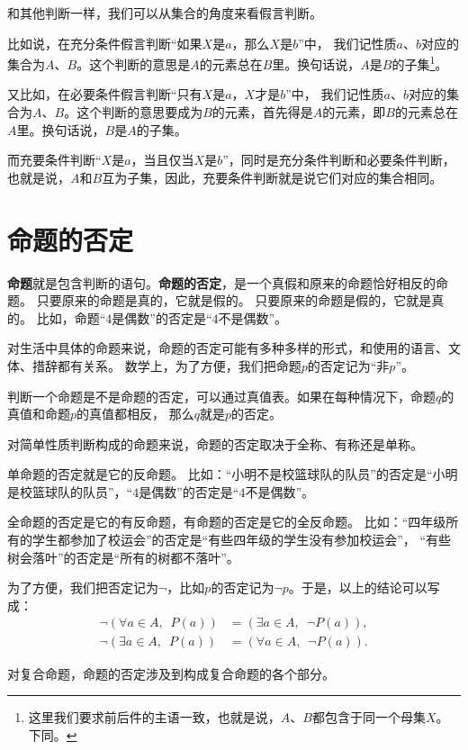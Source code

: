 和其他判断一样，我们可以从集合的角度来看假言判断。

比如说，在充分条件假言判断“如果$X$是$a$，那么$X$是$b$”中，
我们记性质$a$、$b$对应的集合为$A$、$B$。这个判断的意思是$A$的元素总在$B$里。换句话说，$A$是$B$的子集\footnote{这里我们要求前后件的主语一致，也就是说，$A$、$B$都包含于同一个母集$X$。下同。}。

又比如，在必要条件假言判断“只有$X$是$a$，$X$才是$b$”中，
我们记性质$a$、$b$对应的集合为$A$、$B$。这个判断的意思要成为$B$的元素，首先得是$A$的元素，即$B$的元素总在$A$里。换句话说，$B$是$A$的子集。

而充要条件判断“$X$是$a$，当且仅当$X$是$b$”，同时是充分条件判断和必要条件判断，也就是说，$A$和$B$互为子集，因此，充要条件判断就是说它们对应的集合相同。

\section{命题的否定}
\textbf{命题}就是包含判断的语句。\textbf{命题的否定}，是一个真假和原来的命题恰好相反的命题。
只要原来的命题是真的，它就是假的。
只要原来的命题是假的，它就是真的。
比如，命题“$4$是偶数”的否定是“$4$不是偶数”。

对生活中具体的命题来说，命题的否定可能有多种多样的形式，和使用的语言、文体、措辞都有关系。
数学上，为了方便，我们把命题$p$的否定记为“非$p$”。

判断一个命题是不是命题的否定，可以通过真值表。如果在每种情况下，命题$q$的真值和命题$p$的真值都相反，
那么$q$就是$p$的否定。

对简单性质判断构成的命题来说，命题的否定取决于全称、有称还是单称。

单命题的否定就是它的反命题。
比如：“小明不是校篮球队的队员”的否定是“小明是校篮球队的队员”，“$4$是偶数”的否定是“$4$不是偶数”。

全命题的否定是它的有反命题，有命题的否定是它的全反命题。
比如：“四年级所有的学生都参加了校运会”的否定是“有些四年级的学生没有参加校运会”，
“有些树会落叶”的否定是“所有的树都不落叶”。

为了方便，我们把否定记为$\neg$，比如$p$的否定记为$\neg p$。于是，以上的结论可以写成：
\begin{align*}
    \neg  (\forall a\in A, \,\,\, P(a)) &= (\exists a\in A, \,\,\, \neg P(a)),  \\
    \neg  (\exists a\in A, \,\,\, P(a)) &= (\forall a\in A, \,\,\, \neg P(a)). 
\end{align*}

对复合命题，命题的否定涉及到构成复合命题的各个部分。

